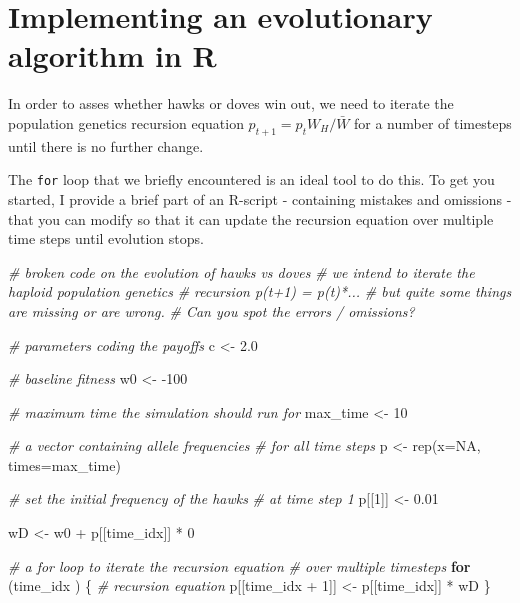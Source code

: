 \documentclass[
]{book}
\newenvironment{Shaded}{\begin{snugshade}}{\end{snugshade}}
\newcommand{\AttributeTok}[1]{\textcolor[rgb]{0.77,0.63,0.00}{#1}}
\newcommand{\CommentTok}[1]{\textcolor[rgb]{0.56,0.35,0.01}{\textit{#1}}}
\newcommand{\ConstantTok}[1]{\textcolor[rgb]{0.00,0.00,0.00}{#1}}
\newcommand{\ControlFlowTok}[1]{\textcolor[rgb]{0.13,0.29,0.53}{\textbf{#1}}}
\newcommand{\DecValTok}[1]{\textcolor[rgb]{0.00,0.00,0.81}{#1}}
\newcommand{\FloatTok}[1]{\textcolor[rgb]{0.00,0.00,0.81}{#1}}
\newcommand{\FunctionTok}[1]{\textcolor[rgb]{0.00,0.00,0.00}{#1}}
\newcommand{\NormalTok}[1]{#1}
\newcommand{\OtherTok}[1]{\textcolor[rgb]{0.56,0.35,0.01}{#1}}
\newcommand{\SpecialCharTok}[1]{\textcolor[rgb]{0.00,0.00,0.00}{#1}}
\begin{document}
\hypertarget{implementing-an-evolutionary-algorithm-in-r}{%
\section{Implementing an evolutionary algorithm in R}\label{implementing-an-evolutionary-algorithm-in-r}}

In order to asses whether hawks or doves win out, we need to iterate the population genetics recursion equation \(p_{t+1} = p_{t} W_{H} / \bar{W}\) for a number of timesteps until there is no further change.

The \texttt{for} loop that we briefly encountered is an ideal tool to do this. To get you started, I provide a brief part of an R-script - containing mistakes and omissions - that you can modify so that it can update the recursion equation over multiple time steps until evolution stops.

\begin{Shaded}
\begin{Highlighting}[]
\CommentTok{\# broken code on the evolution of hawks vs doves}
\CommentTok{\# we intend to iterate the haploid population genetics}
\CommentTok{\# recursion p(t+1) = p(t)*...}
\CommentTok{\# but quite some things are missing or are wrong.}
\CommentTok{\# Can you spot the errors / omissions?}

\CommentTok{\# parameters coding the payoffs}
\NormalTok{c }\OtherTok{\textless{}{-}} \FloatTok{2.0}

\CommentTok{\# baseline fitness}
\NormalTok{w0 }\OtherTok{\textless{}{-}} \SpecialCharTok{{-}}\DecValTok{100}

\CommentTok{\# maximum time the simulation should run for}
\NormalTok{max\_time }\OtherTok{\textless{}{-}} \DecValTok{10}

\CommentTok{\# a vector containing allele frequencies}
\CommentTok{\# for all time steps}
\NormalTok{p }\OtherTok{\textless{}{-}} \FunctionTok{rep}\NormalTok{(}\AttributeTok{x=}\ConstantTok{NA}\NormalTok{, }\AttributeTok{times=}\NormalTok{max\_time)}

\CommentTok{\# set the initial frequency of the hawks}
\CommentTok{\# at time step 1}
\NormalTok{p[[}\DecValTok{1}\NormalTok{]] }\OtherTok{\textless{}{-}} \FloatTok{0.01}


\NormalTok{wD }\OtherTok{\textless{}{-}}\NormalTok{ w0 }\SpecialCharTok{+}\NormalTok{ p[[time\_idx]] }\SpecialCharTok{*} \DecValTok{0}

\CommentTok{\# a for loop to iterate the recursion equation}
\CommentTok{\# over multiple timesteps}
\ControlFlowTok{for}\NormalTok{ (time\_idx  )}
\NormalTok{\{}
    \CommentTok{\# recursion equation}
\NormalTok{    p[[time\_idx }\SpecialCharTok{+} \DecValTok{1}\NormalTok{]] }\OtherTok{\textless{}{-}}\NormalTok{ p[[time\_idx]] }\SpecialCharTok{*}\NormalTok{ wD}
\NormalTok{\}}
\end{Highlighting}
\end{Shaded}
\end{document}
